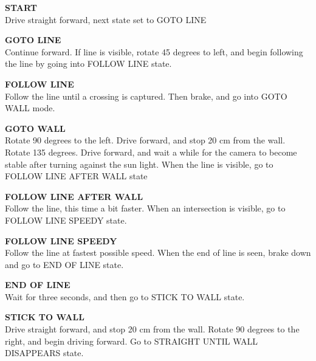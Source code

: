 \begin{itemize}
	\begin{item}
		\textbf{START} \\ Drive straight forward, next state set to GOTO LINE
	\end{item}

	\begin{item}
		\textbf{GOTO LINE} \\ Continue forward. If line is visible, rotate 45 degrees to left, and begin following the line by going into FOLLOW LINE state. 
	\end{item}

	\begin{item}
		\textbf{FOLLOW LINE} \\ Follow the line until a crossing is captured. Then brake, and go into GOTO WALL mode. 
	\end{item}

	\begin{item}
		\textbf{GOTO WALL} \\ Rotate 90 degrees to the left. Drive forward, and stop 20 cm from the wall. Rotate 135 degrees. Drive forward, and wait a while for the camera to become stable after turning against the sun light. When the line is visible, go to FOLLOW LINE AFTER WALL state \\ 
	\end{item}

	\begin{item}
		\textbf{FOLLOW LINE AFTER WALL} \\ Follow the line, this time a bit faster. When an intersection is visible, go to FOLLOW LINE SPEEDY state.
	\end{item}

	\begin{item}
		\textbf{FOLLOW LINE SPEEDY} \\ Follow the line at fastest possible speed. When the end of line is seen, brake down and go to END OF LINE state.
	\end{item}

	\begin{item}
		\textbf{END OF LINE} \\ Wait for three seconds, and then go to STICK TO WALL state.
	\end{item}

	\begin{item}
		\textbf{STICK TO WALL} \\ Drive straight forward, and stop 20 cm from the wall. Rotate 90 degrees to the right, and begin driving forward. Go to STRAIGHT UNTIL WALL DISAPPEARS state.
	\end{item}


\end{itemize}
